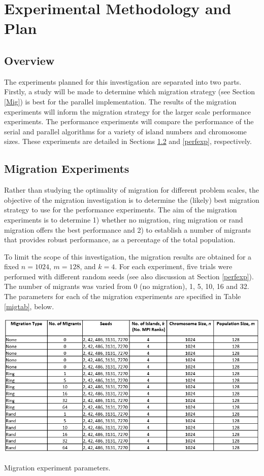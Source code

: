 \documentclass{report}
\begin{document}
\section{Experimental Methodology and Plan}
\subsection{Overview}
The experiments planned for this investigation are separated into two parts. Firstly, a study will be made to determine which migration strategy (see Section \ref{Mig}) is best for the parallel implementation. The results of the migration experiments will inform the migration strategy for the larger scale performance experiments. The performance experiments will compare the performance of the serial and parallel algorithms for a variety of island numbers and chromosome sizes.  These experiments are detailed in Sections \ref{migexp} and \ref{perfexp}, respectively.
\subsection{Migration Experiments}
\label{migexp}
Rather than studying the optimality of migration for different problem scales, the objective of the migration investigation is to determine the (likely) best migration strategy to use for the performance experiments. The aim of the migration experiments is to determine 1) whether no migration, ring migration or rand migration offers the best performance and 2) to establish a number of migrants that provides robust performance, as a percentage of the total population. 

To limit the scope of this investigation, the migration results are obtained for a fixed \(n=1024\), \(m=128\), and \(k=4\). For each experiment, five trials were performed with different random seeds (see also discussion at Section \ref{perfexp}). The number of migrants was varied from 0 (no migration), 1, 5, 10, 16 and 32. The parameters for each of the migration experiments are specified in Table \ref{migtab}, below.
\begin{table}[h]
\includegraphics[scale=0.76]{migration_experiments}
\caption{Migration experiment parameters.}\label{migtab}
\end{table}
\end{document}
